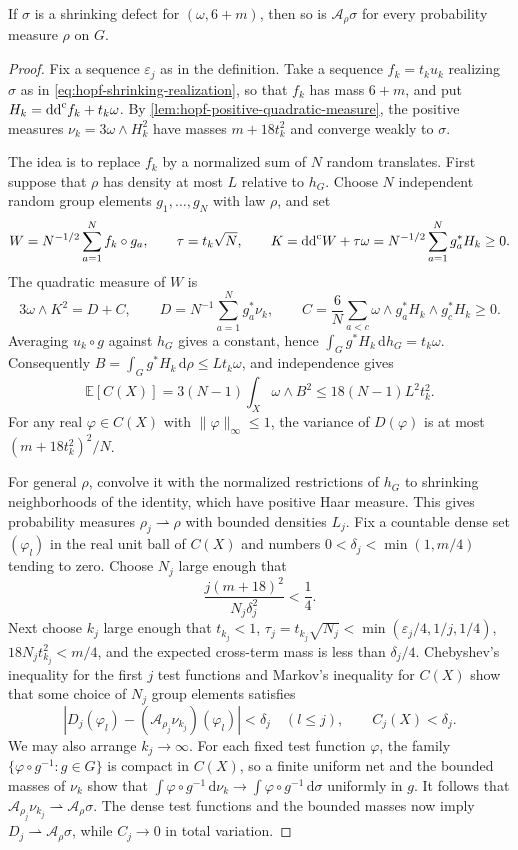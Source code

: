 \begin{proposition}\label{prop:hopf-orbital-defects}
If $\sigma$ is a shrinking defect for $(\omega,6+m)$, then so is $\mathcal A_\rho\sigma$ for every probability measure $\rho$ on $G$.
\end{proposition}
\begin{proof}
Fix a sequence $\varepsilon_j$ as in the definition. Take a sequence $f_k=t_ku_k$ realizing $\sigma$ as in \eqref{eq:hopf-shrinking-realization}, so that $f_k$ has mass $6+m$, and put $H_k=\mathrm{dd}^{\mathrm{c}} f_k+t_k\omega$. By \cref{lem:hopf-positive-quadratic-measure}, the positive measures $\nu_k=3\omega\wedge H_k^2$ have masses $m+18t_k^2$ and converge weakly to $\sigma$.

The idea is to replace $f_k$ by a normalized sum of $N$ random translates. First suppose that $\rho$ has density at most $L$ relative to $h_G$. Choose $N$ independent random group elements $g_1,\ldots,g_N$ with law $\rho$, and set
\[
 W=N^{-1/2}\sum_{a=1}^Nf_k\circ g_a,\qquad
 \tau=t_k\sqrt N,\qquad
 K=\mathrm{dd}^{\mathrm{c}} W+\tau\omega=N^{-1/2}\sum_{a=1}^Ng_a^*H_k\geq0.
\]
The quadratic measure of $W$ is
\[
 3\omega\wedge K^2=D+C,\qquad
 D=N^{-1}\sum_{a=1}^Ng_a^*\nu_k,\qquad
 C=\frac6N\sum_{a<c}\omega\wedge g_a^*H_k\wedge g_c^*H_k\geq0.
\]
Averaging $u_k\circ g$ against $h_G$ gives a constant, hence $\int_Gg^*H_k\,\mathrm{d}h_G=t_k\omega$. Consequently $B=\int_Gg^*H_k\,\mathrm{d}\rho\leq Lt_k\omega$, and independence gives
\[
 \mathbb E[C(X)]=3(N-1)\int_X\omega\wedge B^2
 \leq18(N-1)L^2t_k^2.
\]
For any real $\varphi\in C(X)$ with $\|\varphi\|_\infty\leq1$, the variance of $D(\varphi)$ is at most $(m+18t_k^2)^2/N$.

For general $\rho$, convolve it with the normalized restrictions of $h_G$ to shrinking neighborhoods of the identity, which have positive Haar measure. This gives probability measures $\rho_j\rightharpoonup\rho$ with bounded densities $L_j$. Fix a countable dense set $(\varphi_l)$ in the real unit ball of $C(X)$ and numbers $0<\delta_j<\min(1,m/4)$ tending to zero. Choose $N_j$ large enough that
\[
 \frac{j(m+18)^2}{N_j\delta_j^2}<\frac14.
\]
Next choose $k_j$ large enough that $t_{k_j}<1$, $\tau_j=t_{k_j}\sqrt{N_j}<\min(\varepsilon_j/4,1/j,1/4)$, $18N_jt_{k_j}^2<m/4$, and the expected cross-term mass is less than $\delta_j/4$. Chebyshev's inequality for the first $j$ test functions and Markov's inequality for $C(X)$ show that some choice of $N_j$ group elements satisfies
\[
 |D_j(\varphi_l)-(\mathcal A_{\rho_j}\nu_{k_j})(\varphi_l)|<\delta_j
 \quad(l\leq j),\qquad C_j(X)<\delta_j.
\]
We may also arrange $k_j\to\infty$. For each fixed test function $\varphi$, the family $\{\varphi\circ g^{-1}:g\in G\}$ is compact in $C(X)$, so a finite uniform net and the bounded masses of $\nu_k$ show that $\int\varphi\circ g^{-1}\,\mathrm{d}\nu_k\to\int\varphi\circ g^{-1}\,\mathrm{d}\sigma$ uniformly in $g$. It follows that $\mathcal A_{\rho_j}\nu_{k_j}\rightharpoonup\mathcal A_\rho\sigma$. The dense test functions and the bounded masses now imply $D_j\rightharpoonup\mathcal A_\rho\sigma$, while $C_j\to0$ in total variation.


\end{proof}
